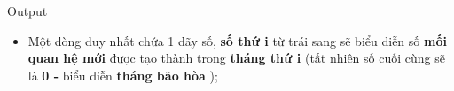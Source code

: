 Output  
\begin{itemize}
	\item     Một dòng duy nhất chứa 1 dãy số,    \textbf{      số thứ i}    từ trái sang sẽ biểu diễn số    \textbf{      mối quan hệ mới}    được tạo thành trong    \textbf{      tháng thứ i}    (tất nhiên số cuối cùng sẽ là    \textbf{      0 -}    biểu diễn    \textbf{      tháng bão hòa}    );   
\end{itemize}